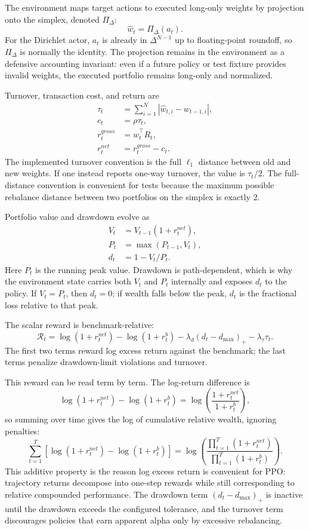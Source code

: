 \documentclass[11pt]{article}
\newcommand{\simplex}{\Delta^{N-1}}
\newcommand{\1}{\mathbf{1}}
\begin{document}
The environment maps target actions to executed long-only weights by projection
onto the simplex, denoted $\Pi_\Delta$:
\[
\hat{w}_t = \Pi_\Delta(a_t).
\]
For the Dirichlet actor, $a_t$ is already in $\simplex$ up to floating-point
roundoff, so $\Pi_\Delta$ is normally the identity. The projection remains in
the environment as a defensive accounting invariant: even if a future policy or
test fixture provides invalid weights, the executed portfolio remains
long-only and normalized.

Turnover, transaction cost, and return are
\begin{align}
\tau_t &= \sum_{i=1}^{N} |\hat{w}_{t,i} - w_{t-1,i}|,\\
c_t &= \rho \tau_t,\\
r^{gross}_t &= \hat{w}_t^\top R_t,\\
r^{net}_t &= r^{gross}_t - c_t.
\end{align}
The implemented turnover convention is the full $\ell_1$ distance between old
and new weights. If one instead reports one-way turnover, the value is
$\tau_t/2$. The full-distance convention is convenient for tests because the
maximum possible rebalance distance between two portfolios on the simplex is
exactly $2$.

Portfolio value and drawdown evolve as
\begin{align}
V_t &= V_{t-1}(1+r^{net}_t),\\
P_t &= \max(P_{t-1},V_t),\\
d_t &= 1 - V_t/P_t.
\end{align}
Here $P_t$ is the running peak value. Drawdown is path-dependent, which is why
the environment state carries both $V_t$ and $P_t$ internally and exposes
$d_t$ to the policy. If $V_t=P_t$, then $d_t=0$; if wealth falls below the
peak, $d_t$ is the fractional loss relative to that peak.

The scalar reward is benchmark-relative:
\[
\mathcal{R}_t =
\log(1+r^{net}_t)-\log(1+r^{b}_t)
- \lambda_d(d_t-d_{\max})_+
- \lambda_\tau \tau_t.
\]
The first two terms reward log excess return against the benchmark; the last
terms penalize drawdown-limit violations and turnover.

This reward can be read term by term. The log-return difference is
\[
\log(1+r^{net}_t)-\log(1+r^b_t)
=\log\left(\frac{1+r^{net}_t}{1+r^b_t}\right),
\]
so summing over time gives the log of cumulative relative wealth, ignoring
penalties:
\[
\sum_{t=1}^{T}
\left[\log(1+r^{net}_t)-\log(1+r^b_t)\right]
=
\log\left(
\frac{\prod_{t=1}^{T}(1+r^{net}_t)}
{\prod_{t=1}^{T}(1+r^b_t)}
\right).
\]
This additive property is the reason log excess return is convenient for PPO:
trajectory returns decompose into one-step rewards while still corresponding to
relative compounded performance. The drawdown term
$(d_t-d_{\max})_+$ is inactive until the drawdown exceeds the configured
tolerance, and the turnover term discourages policies that earn apparent alpha
only by excessive rebalancing.
\end{document}
